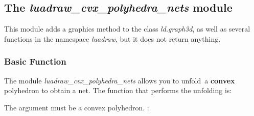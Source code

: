 \subsection{The \emph{luadraw\_cvx\_polyhedra\_nets} module}

This module adds a graphics method to the class \emph{ld.graph3d}, as well as several functions in the namespace \emph{luadraw}, but it does not return anything.

\subsubsection{Basic Function}

The module \emph{luadraw\_cvx\_polyhedra\_nets} allows you to \og unfold\fg\ a \textbf{convex} polyhedron to obtain a net. The function that performs the unfolding is:


The argument  must be a convex polyhedron. \writeoptions:

